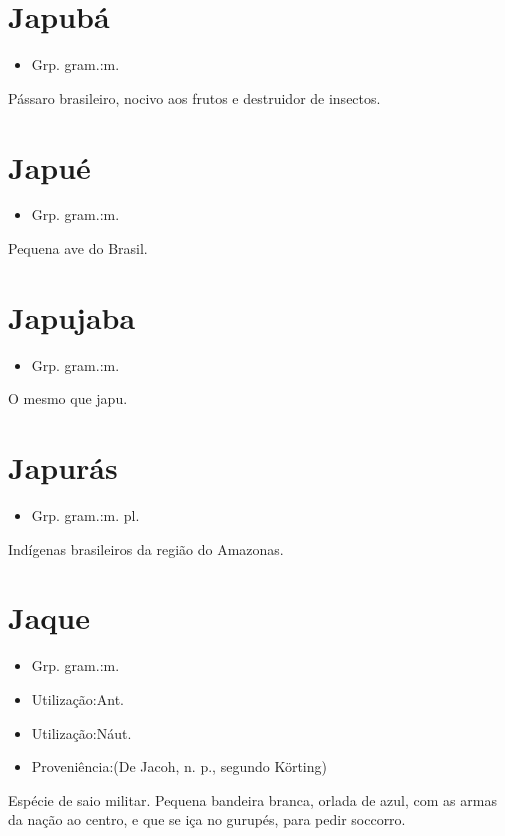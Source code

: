 \documentclass{article}
\begin{document}
\section{Japubá}
\begin{itemize}
\item {Grp. gram.:m.}
\end{itemize}
Pássaro brasileiro, nocivo aos frutos e destruidor de insectos.
\section{Japué}
\begin{itemize}
\item {Grp. gram.:m.}
\end{itemize}
Pequena ave do Brasil.
\section{Japujaba}
\begin{itemize}
\item {Grp. gram.:m.}
\end{itemize}
O mesmo que \textunderscore japu\textunderscore .
\section{Japurás}
\begin{itemize}
\item {Grp. gram.:m. pl.}
\end{itemize}
Indígenas brasileiros da região do Amazonas.
\section{Jaque}
\begin{itemize}
\item {Grp. gram.:m.}
\end{itemize}
\begin{itemize}
\item {Utilização:Ant.}
\end{itemize}
\begin{itemize}
\item {Utilização:Náut.}
\end{itemize}
\begin{itemize}
\item {Proveniência:(De \textunderscore Jacoh\textunderscore , n. p., segundo Körting)}
\end{itemize}
Espécie de saio militar.
Pequena bandeira branca, orlada de azul, com as armas da nação ao centro, e que se iça no gurupés, para pedir soccorro.
\end{document}
